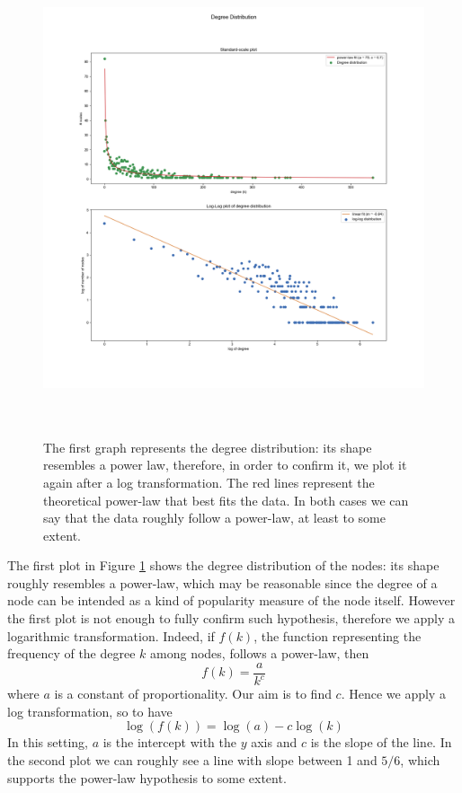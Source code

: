 \documentclass{report}
\theoremstyle{definition}
\theoremstyle{remark}
\begin{document}
\begin{figure} [H]
	\centering
	\centerline{\includegraphics[width = 18cm, height = 14cm, keepaspectratio]{degree_distribution.png}}
	\caption{The first graph represents the degree distribution: its shape resembles a power law, therefore, in order to confirm it, we plot it again after a log transformation. The red lines represent the theoretical power-law that best fits the data. In both cases we can say that the data roughly follow a power-law, at least to some extent.} \label{fig:DegDistMail}
\end{figure}

The first plot in Figure \ref{fig:DegDistMail} shows the degree distribution of the nodes: its shape roughly resembles a power-law, which may be reasonable since the degree of a node can be intended as a kind of popularity measure of the node itself. However the first plot is not enough to fully confirm such hypothesis, therefore we apply a logarithmic transformation. Indeed, if $f(k)$, the function representing the frequency of the degree $k$ among nodes, follows a power-law, then
\begin{equation*}
f(k)  = \frac{a}{k^c}
\end{equation*}
where $a$ is a constant of proportionality. Our aim is to find $c$. Hence we apply a log transformation, so to have
\begin{equation*}
\log(f(k)) = \log(a) -c \log(k)
\end{equation*}
In this setting, $a$ is the intercept with the $y$ axis and $c$ is the slope of the line. In the second plot we can roughly see a line with slope between 1 and $5/6$, which supports the power-law hypothesis to some extent.
\end{document}

